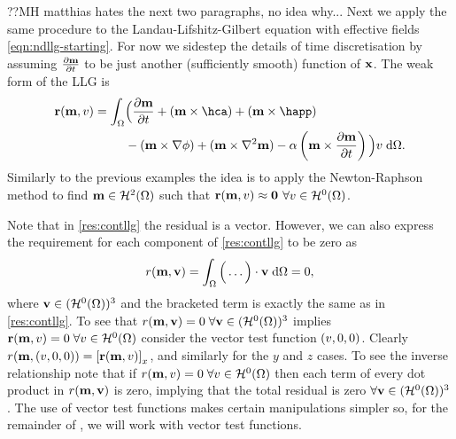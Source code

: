 {??MH matthias hates the next two paragraphs, no idea why...
Next we apply the same procedure to the Landau-Lifshitz-Gilbert equation with effective fields \cref{eqn:ndllg-starting}.
For now we sidestep the details of time discretisation by assuming $\frac{\partial \boldsymbol{\mathrm{m}}}{\partial t}$ to be just another (sufficiently smooth) function of $\boldsymbol{\mathrm{x}}$.
The weak form of the LLG is
\begin{equation}
  \begin{aligned}
    \rllgv(\mv, \test) = \int_\magd &\Big( \dmdt
    + (\mv \times \hca) + (\mv \times \happ) \\
    &- (\mv \times \grad \phi) + (\mv \times \lap \mv) - \dampc \left( \mv
      \times \dmdt \right) \Big) \test \d\magd.
    \label{res:contllg}
  \end{aligned}
\end{equation}
Similarly to the previous examples the idea is to apply the Newton-Raphson method to find $\boldsymbol{\mathrm{m}} \in \mathcal{H}^2(\Omega)$ such that $\boldsymbol{\mathrm{r}}(\boldsymbol{\mathrm{m}}, v) \approx \mathbf{0}$ $\forall v \in \mathcal{H}^0(\Omega)$.

Note that in \cref{res:contllg} the residual is a vector.
However, we can also express the requirement for each component of \cref{res:contllg} to be zero as
\begin{equation}
  r(\boldsymbol{\mathrm{m}}, \boldsymbol{\mathrm{v}}) = \int_\Omega \Big( \ldots  \Big) \cdot \boldsymbol{\mathrm{v}} {\; \mathrm{{d}}}\Omega = 0,
\end{equation}
where $\boldsymbol{\mathrm{v}} \in (\mathcal{H}^0(\Omega))^3$ and the bracketed term is exactly the same as in \cref{res:contllg}.
To see that $r(\boldsymbol{\mathrm{m}}, \boldsymbol{\mathrm{v}}) = 0\; \forall \boldsymbol{\mathrm{v}} \in (\mathcal{H}^0(\Omega))^3$ implies $\boldsymbol{\mathrm{r}}(\boldsymbol{\mathrm{m}}, v) = 0 \; \forall v \in \mathcal{H}^0(\Omega)$ consider the vector test function $(v, 0, 0)$.
Clearly $r(\boldsymbol{\mathrm{m}}, (v, 0, 0)) = {\left[ \boldsymbol{\mathrm{r}}(\boldsymbol{\mathrm{m}}, v) \right]}_x$, and similarly for the $y$ and $z$ cases.
To see the inverse relationship note that if $r(\boldsymbol{\mathrm{m}}, v) = 0\; \forall v \in \mathcal{H}^0(\Omega)$ then each term of every dot product in $r(\boldsymbol{\mathrm{m}}, \boldsymbol{\mathrm{v}})$ is zero, implying that the total residual is zero $\forall \boldsymbol{\mathrm{v}} \in (\mathcal{H}^0(\Omega))^3$.
The use of vector test functions makes certain manipulations simpler so, for the remainder of , we will work with vector test functions.

}
